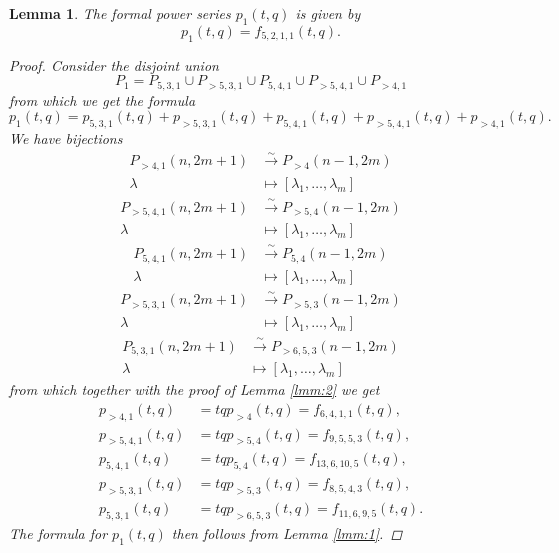 \documentclass[12pt,a4paper]{article}
\newtheorem{lemma}{Lemma}
\begin{document}
\begin{lemma}
  \label{lmm:3}
  The formal power series $p_1(t,q)$ is given by
  \begin{equation*}
    p_1(t,q)=f_{5,2,1,1}(t,q).
  \end{equation*}
  \begin{proof}
    Consider the disjoint union
    \begin{equation*}
      P_1=P_{5,3,1}\cup P_{>5,3,1}\cup P_{5,4,1}\cup P_{>5,4,1}\cup P_{>4,1}
    \end{equation*}
    from which we get the formula
    \begin{equation*}
      p_1(t,q)=p_{5,3,1}(t,q)+p_{>5,3,1}(t,q)+p_{5,4,1}(t,q)+p_{>5,4,1}(t,q)+p_{>4,1}(t,q).
    \end{equation*}
    We have bijections
    \begin{align*}
      P_{>4,1}(n,2m+1)&\xrightarrow{\sim} P_{>4}(n-1,2m) \\
      \lambda&\mapsto [\lambda_1,\dots, \lambda_m]
    \end{align*}
    \begin{align*}
      P_{>5,4,1}(n,2m+1)&\xrightarrow{\sim} P_{>5,4}(n-1,2m) \\
      \lambda&\mapsto [\lambda_1,\dots, \lambda_m]
    \end{align*}
    \begin{align*}
      P_{5,4,1}(n,2m+1)&\xrightarrow{\sim} P_{5,4}(n-1,2m) \\
      \lambda&\mapsto [\lambda_1,\dots, \lambda_m]
    \end{align*}
    \begin{align*}
      P_{>5,3,1}(n,2m+1)&\xrightarrow{\sim} P_{>5,3}(n-1,2m) \\
      \lambda&\mapsto [\lambda_1,\dots, \lambda_m]
    \end{align*}
    \begin{align*}
      P_{5,3,1}(n,2m+1)&\xrightarrow{\sim} P_{>6,5,3}(n-1,2m) \\
      \lambda&\mapsto [\lambda_1,\dots, \lambda_m]
    \end{align*}
    from which together with the proof of Lemma \ref{lmm:2} we get
    \begin{align*}
      p_{>4,1}(t,q)&=tqp_{>4}(t,q)=f_{6,4,1,1}(t,q), \\
      p_{>5,4,1}(t,q)&=tqp_{>5,4}(t,q)=f_{9,5,5,3}(t,q), \\
      p_{5,4,1}(t,q)&=tqp_{5,4}(t,q)=f_{13,6,10,5}(t,q), \\
      p_{>5,3,1}(t,q)&=tqp_{>5,3}(t,q)=f_{8,5,4,3}(t,q), \\
      p_{5,3,1}(t,q)&=tqp_{>6,5,3}(t,q)=f_{11,6,9,5}(t,q).
    \end{align*}
    The formula for $p_1(t,q)$ then follows from Lemma \ref{lmm:1}.
  \end{proof}
\end{lemma}
\end{document}

